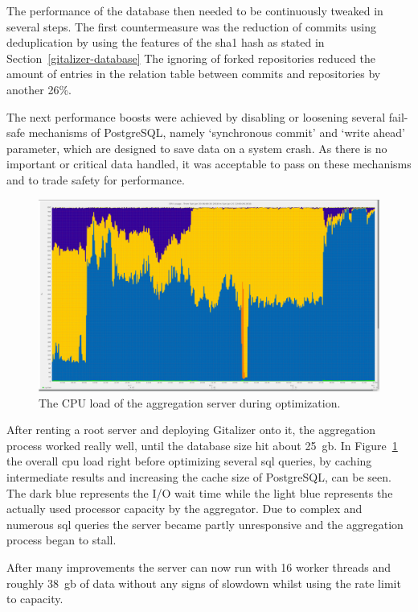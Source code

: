 The performance of the database then needed to be continuously tweaked in several steps.
The first countermeasure was the reduction of commits using deduplication by using the features of the \ac{sha1} hash as stated in Section~\ref{gitalizer-database}
The ignoring of forked repositories reduced the amount of entries in the relation table between commits and repositories by another 26\%.

The next performance boosts were achieved by disabling or loosening several fail-safe mechanisms of PostgreSQL, namely `synchronous commit' and `write ahead' parameter, which are designed to save data on a system crash.
As there is no important or critical data handled, it was acceptable to pass on these mechanisms and to trade safety for performance.

\begin{figure}[H]
\includegraphics[scale=0.22]{./graphs/server-graphs/query-refactoring}
\centering
\caption{The CPU load of the aggregation server during optimization.}\label{fig:cpu-load}
\end{figure}

After renting a root server and deploying Gitalizer onto it, the aggregation process worked really well, until the database size hit about 25~\ac{gb}.
In Figure~\ref{fig:cpu-load} the overall \ac{cpu} load right before optimizing several \ac{sql} queries, by caching intermediate results and increasing the cache size of PostgreSQL, can be seen.
The dark blue represents the I/O wait time while the light blue represents the actually used processor capacity by the aggregator.
Due to complex and numerous \ac{sql} queries the server became partly unresponsive and the aggregation process began to stall.

After many improvements the server can now run with 16 worker threads and roughly 38~\ac{gb} of data without any signs of slowdown whilst using the rate limit to capacity.


